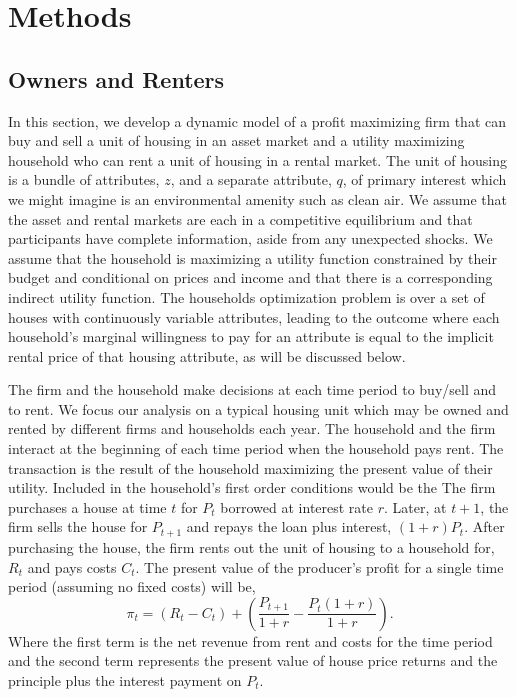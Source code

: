 \documentclass[ecta,nameyear,draft]{econsocart}
\theoremstyle{plain}
\theoremstyle{remark}
\begin{document}
\section{Methods}
\subsection{Owners and Renters}
In this section, we develop a dynamic model of a profit maximizing firm that can buy and sell a unit of housing in an asset market and a utility maximizing household who can rent a unit of housing in a rental market. The unit of housing is a bundle of attributes, $z$, and a separate attribute, $q$, of primary interest which we might imagine is an environmental amenity such as clean air. We assume that the asset and rental markets are each in a competitive equilibrium and that participants have complete information, aside from any unexpected shocks.
We assume that the household is maximizing a utility function constrained by their budget and conditional on prices and income and that there is a corresponding indirect utility function. The households optimization problem is over a set of houses with continuously variable attributes, leading to the outcome where each household's marginal willingness to pay for an attribute is equal to the implicit rental price of that housing attribute, as will be discussed below.

The firm and the household make decisions at each time period to buy/sell and to rent. We focus our analysis on a typical housing unit which may be owned and rented by different firms and households each year. 
The household and the firm interact at the beginning of each time period when the household pays rent. The transaction is the result of the household maximizing the present value of their utility. Included in the household's first order conditions would be the  
The firm purchases a house at time $t$ for $P_t$ borrowed at interest rate $r$. Later, at $t+1$, the firm sells the house for $P_{t+1}$ and repays the loan plus interest, $(1 + r)P_t$. After purchasing the house, the firm rents
out the unit of housing to a household for, $R_t$ and pays costs $C_t$. The present value of the producer’s profit for a single time period (assuming no fixed costs) will be,
\begin{equation}
	\pi_t = (R_t-C_t)+\left(\frac{P_{t+1}}{1+r}-\frac{P_t(1+r)}{1+r}\right).\label{pi1}
\end{equation}
Where the first term is the net revenue from rent and costs for the time period and the second term
represents the present value of house price returns and the principle plus the interest payment on $P_t$.
\end{document}

